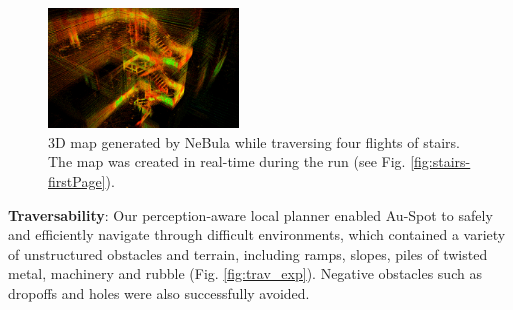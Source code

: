\documentclass[letterpaper, 10pt, conference]{ieeeconf}      %
\newcommand{\ph}[1]{{\textbf{#1}:}} %
\begin{document}
  
  

\begin{figure}[t!]  %
  \centering
  \includegraphics[width=0.45\textwidth]{graphics/spot_alpha_course_stairs.PNG}
  \caption{3D map generated by NeBula while traversing four flights of stairs. The map was created in real-time during the run (see Fig. \ref{fig:stairs-firstPage}).}
  \label{fig:alpha_course_stairs_map}
\end{figure}




\ph{Traversability}
Our perception-aware local planner enabled Au-Spot to safely and efficiently navigate through difficult environments, which contained a variety of unstructured obstacles and terrain, including ramps, slopes, piles of twisted metal, machinery and rubble (Fig. \ref{fig:trav_exp}).  Negative obstacles such as dropoffs and holes were also successfully avoided.
\end{document}

